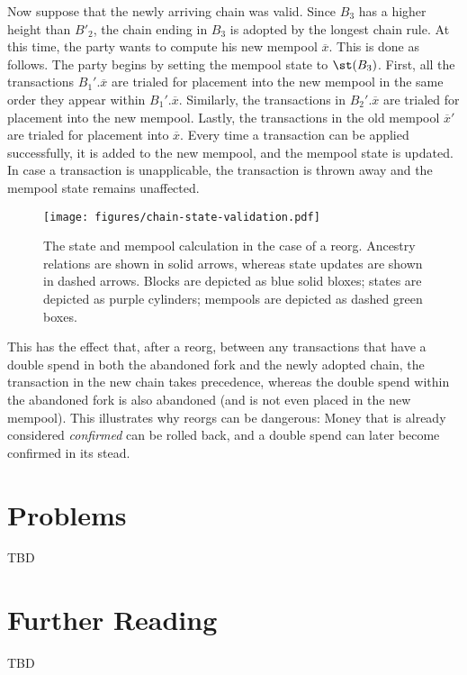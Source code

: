 Now suppose that the newly arriving chain was valid. Since $B_3$ has a higher height than $B'_2$,
the chain ending in
$B_3$ is adopted by the longest chain rule.
At this time, the party wants to compute his new mempool $\overline{x}$.
This is done as follows. The party begins by setting the mempool state to $\st(B_3)$.
First, all the transactions $B_1'.\overline{x}$ are trialed for placement into the new
mempool in the same order they appear within $B_1'.\overline{x}$. Similarly, the
transactions in $B_2'.\overline{x}$ are trialed for placement into the new mempool.
Lastly, the transactions in the old mempool $\overline{x}'$ are trialed for placement
into $\overline{x}$. Every time a transaction can be applied successfully, it is
added to the new mempool, and the mempool state is updated. In case a transaction
is unapplicable, the transaction is thrown away and the mempool state remains unaffected.

\begin{figure}[h]
    \centering
    \texttt{[image: figures/chain-state-validation.pdf]}
    \caption{The state and mempool calculation in the case of a reorg. Ancestry relations
             are shown in solid arrows, whereas state updates are shown in dashed arrows.
             Blocks are depicted as blue solid bloxes; states are depicted as purple cylinders;
             mempools are depicted as dashed green boxes.}
    \label{fig.chain-state-validation}
\end{figure}

This has the effect that, after a reorg, between any transactions that have a double spend in both
the abandoned fork and the newly adopted chain, the transaction in the new
chain takes precedence, whereas the double spend within the abandoned fork is also abandoned
(and is not even placed in the new mempool). This illustrates why reorgs can be dangerous:
Money that is already considered \emph{confirmed} can be rolled back, and a double spend can later
become confirmed in its stead.


\section{Problems}

TBD

\section{Further Reading}

TBD
